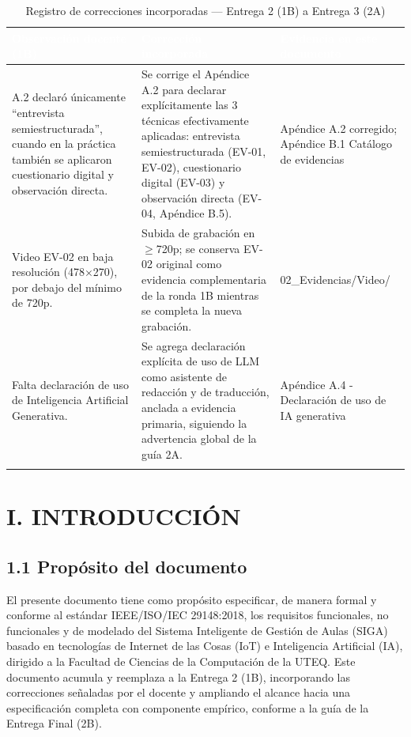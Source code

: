 \begingroup
\small
\begin{longtable}{|P{0.3333}|P{0.3333}|P{0.3333}|}
\hline
{}\textcolor{white}{\textbf{Observación docente (1B)}} & \textcolor{white}{\textbf{Corrección incorporada}} & \textcolor{white}{\textbf{Evidencia en este documento}} \\ \hline
A.2 declaró únicamente ``entrevista semiestructurada'', cuando en la práctica también se aplicaron cuestionario digital y observación directa. & Se corrige el Apéndice A.2 para declarar explícitamente las 3 técnicas efectivamente aplicadas: entrevista semiestructurada (EV-01, EV-02), cuestionario digital (EV-03) y observación directa (EV-04, Apéndice B.5). & Apéndice A.2 corregido; Apéndice B.1 Catálogo de evidencias \\ \hline
Video EV-02 en baja resolución (478$\times$270), por debajo del mínimo de 720p. & Subida de grabación en $\geq$720p; se conserva EV-02 original como evidencia complementaria de la ronda 1B mientras se completa la nueva grabación. & 02\_Evidencias/Video/ \\ \hline
Falta declaración de uso de Inteligencia Artificial Generativa. & Se agrega declaración explícita de uso de LLM como asistente de redacción y de traducción, anclada a evidencia primaria, siguiendo la advertencia global de la guía 2A. & Apéndice A.4 - Declaración de uso de IA generativa \\ \hline
\caption{Registro de correcciones incorporadas --- Entrega 2 (1B) a Entrega 3 (2A)}
\end{longtable}
\endgroup

\section*{I. INTRODUCCIÓN}


\subsection*{1.1 Propósito del documento}


El presente documento tiene como propósito especificar, de manera formal y conforme al estándar IEEE/ISO/IEC 29148:2018, los requisitos funcionales, no funcionales y de modelado del Sistema Inteligente de Gestión de Aulas (SIGA) basado en tecnologías de Internet de las Cosas (IoT) e Inteligencia Artificial (IA), dirigido a la Facultad de Ciencias de la Computación de la UTEQ. Este documento acumula y reemplaza a la Entrega 2 (1B), incorporando las correcciones señaladas por el docente y ampliando el alcance hacia una especificación completa con componente empírico, conforme a la guía de la Entrega Final (2B).


